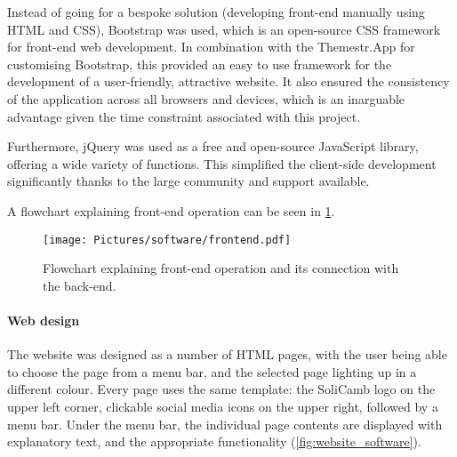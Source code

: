 Instead of going for a bespoke solution (developing front-end manually using HTML and CSS), Bootstrap was used, which is an open-source CSS framework for front-end web development. In combination with the Themestr.App for customising Bootstrap, this provided an easy to use framework for the development of a user-friendly, attractive website. It also ensured the consistency of the application across all browsers and devices, which is an inarguable advantage given the time constraint associated with this project.


Furthermore, jQuery was used as a free and open-source JavaScript library, offering a wide variety of functions. This simplified the client-side development significantly thanks to the large community and support available.

A flowchart explaining front-end operation can be seen in \cref{fig:frontend}.

\begin{figure}
    \centering
    \texttt{[image: Pictures/software/frontend.pdf]}
    \captionsetup{justification = centering}
    \caption{Flowchart explaining front-end operation and its connection with the back-end.}
    \label{fig:frontend}
\end{figure}

\paragraph{Web design}

The website was designed as a number of HTML pages, with the user being able to choose the page from a menu bar, and the selected page lighting up in a different colour. Every page uses the same template: the SoliCamb logo on the upper left corner, clickable social media icons on the upper right, followed by a menu bar. Under the menu bar, the individual page contents are displayed with explanatory text, and the appropriate functionality (\cref{fig:website_software}).\\

